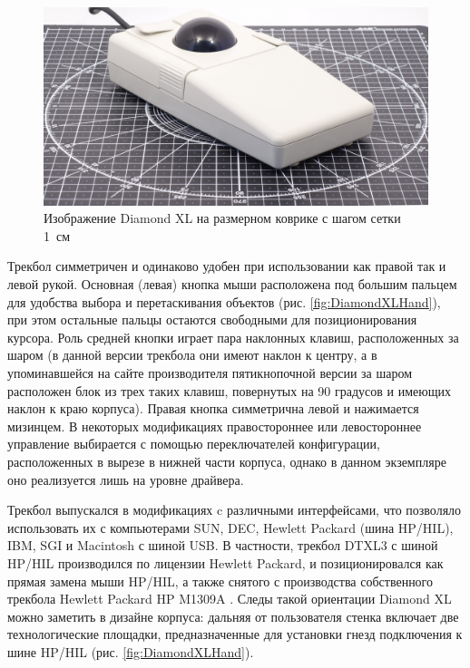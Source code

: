 \documentclass[11pt, a4paper]{article}
\begin{document}
\begin{figure}[h]
    \centering
    \includegraphics[scale=0.35]{1993_evergreen_diamond_xl_trackball/size.jpg}
    \caption{Изображение Diamond XL на размерном коврике с шагом сетки 1~см}
    \label{fig:DiamondXLSize}
\end{figure}

Трекбол симметричен и одинаково удобен при использовании как правой так и левой рукой. Основная (левая) кнопка мыши расположена под большим пальцем для удобства выбора и перетаскивания объектов (рис. \ref{fig:DiamondXLHand}), при этом остальные пальцы остаются свободными для позиционирования курсора. Роль средней кнопки играет пара наклонных клавиш, расположенных за шаром (в данной версии трекбола они имеют наклон к центру, а в упоминавшейся на сайте производителя пятикнопочной версии \cite{evergreen} за шаром расположен блок из трех таких клавиш, повернутых на 90 градусов и имеющих наклон к краю корпуса). Правая кнопка симметрична левой и нажимается мизинцем. В некоторых модификациях правостороннее или левостороннее управление выбирается с помощью переключателей конфигурации, расположенных в вырезе в нижней части корпуса, однако в данном экземпляре оно реализуется лишь на уровне драйвера.

Трекбол выпускался в модификациях c различными интерфейсами, что позволяло использовать их с компьютерами SUN, DEC, Hewlett Packard (шина HP/HIL), IBM, SGI и Macintosh с шиной USB. В частности, трекбол DTXL3 с шиной HP/HIL производился по лицензии Hewlett Packard, и позиционировался как прямая замена мыши HP/HIL, а также снятого с производства собственного трекбола Hewlett Packard HP M1309A \cite{dtxl3, hphil}. Следы такой ориентации Diamond XL можно заметить в дизайне корпуса: дальняя от пользователя стенка включает две технологические площадки, предназначенные для установки гнезд подключения к шине HP/HIL (рис. \ref{fig:DiamondXLHand}).
\end{document}
